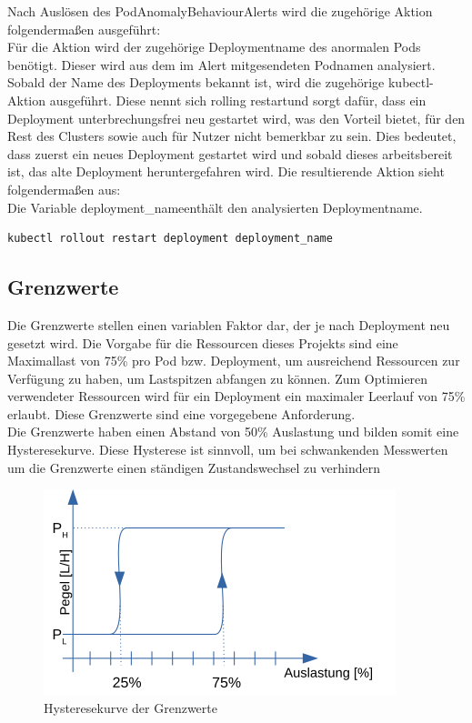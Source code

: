 \documentclass[a4paper,10pt]{scrartcl}
\begin{document}
Nach Auslösen des \glqq PodAnomalyBehaviour\grqq Alerts wird die zugehörige Aktion folgendermaßen ausgeführt:\\

Für die Aktion wird der zugehörige Deploymentname des anormalen Pods benötigt. Dieser wird aus dem im Alert mitgesendeten Podnamen analysiert. Sobald der Name des Deployments bekannt ist, wird die zugehörige kubectl-Aktion ausgeführt. Diese nennt sich \glqq rolling restart\grqq und sorgt dafür, dass ein Deployment unterbrechungsfrei neu gestartet wird, was den Vorteil bietet, für den Rest des Clusters sowie auch für Nutzer nicht bemerkbar zu sein. Dies bedeutet, dass zuerst ein neues Deployment gestartet wird und sobald dieses arbeitsbereit ist, das alte Deployment heruntergefahren wird. Die resultierende Aktion sieht folgendermaßen aus:\\
Die Variable \glqq deployment\_name\grqq enthält den analysierten Deploymentname.

\begin{verbatim}
kubectl rollout restart deployment deployment_name
\end{verbatim}

\subsection{Grenzwerte}

Die Grenzwerte stellen einen variablen Faktor dar, der je nach Deployment neu gesetzt wird. Die Vorgabe für die Ressourcen dieses Projekts sind eine Maximallast von 75\% pro Pod bzw. Deployment, um ausreichend Ressourcen zur Verfügung zu haben, um Lastspitzen abfangen zu können. Zum Optimieren verwendeter Ressourcen wird für ein Deployment ein maximaler Leerlauf von 75\% erlaubt. Diese Grenzwerte sind eine vorgegebene Anforderung.\\
Die Grenzwerte haben einen Abstand von 50\% Auslastung und bilden somit eine Hysteresekurve. Diese Hysterese ist sinnvoll, um bei schwankenden Messwerten um die Grenzwerte einen ständigen Zustandswechsel zu verhindern

\begin{figure}[htbp]
  \includegraphics{Hysterese.png}
  \caption{Hysteresekurve der Grenzwerte}
\end{figure}
\pagebreak
\end{document}
